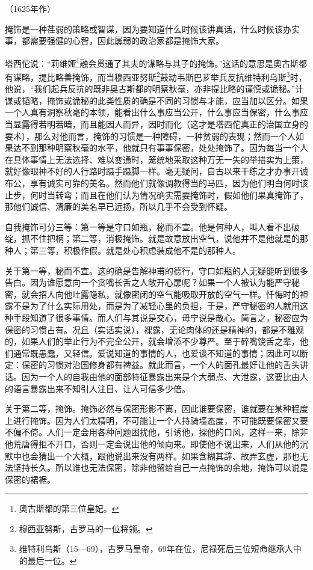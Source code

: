 \begin{center}
    （1625年作）
\end{center}
\par 掩饰是一种荏弱的策略或智谋，因为要知道什么时候该讲真话，什么时候该办实事，都需要强健的心智，因此孱弱的政治家都是掩饰大家。
\par 塔西佗说：“莉维娅\footnote{奥古斯都的第三位皇妃。}融会贯通了其夫的谋略与其子的掩饰。”这话的意思是奥古斯都有谋略，提比略善掩饰，而当穆西亚努斯\footnote{穆西亚努斯，古罗马的一位将领。}鼓动韦斯巴芗举兵反抗维特利乌斯\footnote{维特利乌斯（15—69），古罗马皇帝，69年在位，尼禄死后三位短命继承人中的最后一位。}时，他说，“我们起兵反抗的既非奥古斯都的明察秋毫，亦非提比略的谨慎或诡秘。”计谋或韬略，掩饰或诡秘的此类性质的确是不同的习惯与才能，应当加以区分。如果一个人真有洞察秋毫的本领，能看出什么事应当公开，什么事应当保密，什么事应当显露得若明若暗，而且能因人而异，因时而化（这才是塔西佗真正的治国立身的要术），那么对他而言，掩饰的习惯是一种障碍，一种贫弱的表现；然而一个人如果达不到那种明察秋毫的水平，他就只有事事保密，处处掩饰了。因为每当一个人在具体事情上无法选择、难以变通时，笼统地采取这种万无一失的举措实为上策，就好像眼神不好的人行路时蹑手蹑脚一样。毫无疑问，自古以来干练之才办事开诚布公，享有诚实可靠的美名。然而他们就像调教得当的马匹，因为他们明白何时该止步，何时当转弯；而且在他们认为情况确实需要掩饰时，假如他们果真掩饰了，那他们诚信、清廉的美名早已远扬，所以几乎不会受到怀疑。
\par 自我掩饰可分三等：第一等是守口如瓶，秘而不宣。他是何种人，叫人看不出破绽，抓不住把柄；第二等，消极掩饰。就是故意放出空气，说他并不是他就是的那种人；第三等，积极作假。就是处心积虑装成他不是的那种人。
\par 关于第一等，秘而不宣。这的确是告解神甫的德行，守口如瓶的人无疑能听到很多告白。因为谁愿意向一个贪嘴长舌之人敞开心扉呢？如果一个人被认为能严守秘密，就会招人向他吐露隐私，就像密闭的空气能吸取开放的空气一样。忏悔时的袒露不是为了什么实际用处，而是为了减轻心里的负担，于是，严守秘密的人就用这种手段知道了很多事情。而人们与其说是交心，毋宁说是散心。简言之，秘密应为保密的习惯占有。况且（实话实说），裸露，无论肉体的还是精神的，都是不雅观的，如果人们的举止行为不完全公开，就会增添不少尊严。至于碎嘴饶舌之辈，他们通常既愚蠢，又轻信。爱说知道的事情的人，也爱谈不知道的事情；因此可以断定：保密的习惯对治国修身都有裨益。就此而言，一个人的面孔最好让他的舌头讲话。因为一个人的自我由他的面部特征暴露出来是个大弱点、大泄露，这要比由人的语言暴露出来不知引人注目、让人可信多少倍。
\par 关于第二等，掩饰。掩饰必然与保密形影不离，因此谁要保密，谁就要在某种程度上进行掩饰。因为人们太精明，不可能让一个人持骑墙态度，不可能既要保密又要不偏不倚。人们一定会用各种问题困扰他，引诱他，探他的口风，这样一来，除非他荒唐得拒不开口，否则一定会说出他的倾向来。即使他不说出来，人们从他的沉默中也会猜出一个大概，跟他说出来没有两样。如果含糊其辞、故弄玄虚，那也无法坚持长久。所以谁也无法保密，除非他留给自己一点掩饰的余地，掩饰可以说是保密的裙裾。
